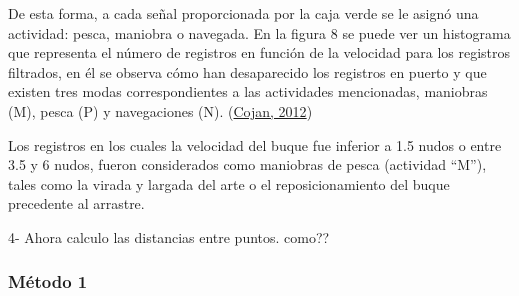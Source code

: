 \documentclass[
]{article}
\begin{document}
De esta forma, a cada señal proporcionada por la caja verde se le asignó una actividad: pesca, maniobra o navegada. En la figura 8 se puede ver un histograma que representa el número de registros en función de la velocidad para los registros filtrados, en él se observa cómo han desaparecido los registros en puerto y que existen tres modas correspondientes a las actividades mencionadas, maniobras (M), pesca (P) y navegaciones (N). (\protect\hyperlink{ref-Cohan2012}{Cojan, 2012})

Los registros en los cuales la velocidad del buque fue inferior a 1.5 nudos o entre 3.5 y 6 nudos, fueron considerados como maniobras de pesca (actividad ``M''), tales como la virada y largada del arte o el reposicionamiento del buque precedente al arrastre.

4- Ahora calculo las distancias entre puntos. como??

\newpage

\hypertarget{muxe9todo-1}{%
\subsubsection{Método 1}\label{muxe9todo-1}}
\end{document}
